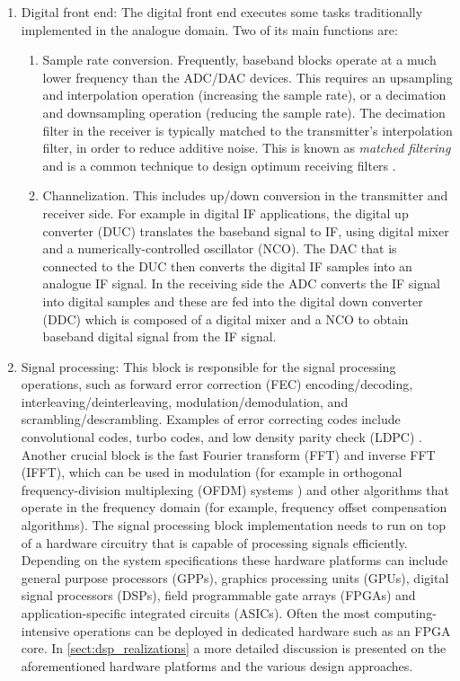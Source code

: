 \begin{enumerate}
  \item Digital front end: The digital front end executes some tasks traditionally implemented in the analogue domain. Two of its main functions are\cite{digital_frontend_sdr}:
  \begin{enumerate}
    \item  Sample rate conversion. Frequently, baseband blocks operate at a much lower frequency than the ADC/DAC devices. This requires an upsampling and interpolation operation (increasing the sample rate), or a decimation and downsampling operation (reducing the sample rate). The decimation filter in the receiver is typically matched to the transmitter's interpolation filter, in order to reduce additive noise. This is known as \emph{matched filtering} and is a common technique to design optimum receiving filters \cite{communication_systems_carlson}.
    \item Channelization. This includes up/down conversion in the transmitter and receiver side. For example in digital IF applications, the digital up converter (DUC) translates the baseband signal to IF, using digital mixer and a numerically-controlled oscillator (NCO). The DAC that is connected to the DUC then converts the digital IF samples into an analogue IF signal. In the receiving side the ADC converts the IF signal into digital samples and these are fed into the digital down converter (DDC) which is composed of a digital mixer and a NCO to obtain baseband digital signal from the IF signal.
  \end{enumerate}

  \item Signal processing: This block is responsible for the signal processing operations, such as forward error correction (FEC) encoding/decoding, interleaving/deinterleaving, modulation/demodulation, and scrambling/descrambling. Examples of error correcting codes include convolutional codes, turbo codes, and low density parity check (LDPC) \cite{crc_for_short_control_frames}. Another crucial block is the fast Fourier transform (FFT) and inverse FFT (IFFT), which can be used in modulation (for example in orthogonal frequency-division multiplexing (OFDM) systems \cite{ofdm_baseband_receiver}) and other algorithms that operate in the frequency domain (for example, frequency offset compensation algorithms). The signal processing block implementation needs to run on top of a hardware circuitry that is capable of processing signals efficiently. Depending on the system specifications these hardware platforms can include general purpose processors (GPPs), graphics processing units (GPUs), digital signal processors (DSPs), field programmable gate arrays (FPGAs) and application-specific integrated circuits (ASICs). Often the most computing-intensive operations can be deployed in dedicated hardware such as an FPGA core. In \autoref{sect:dsp_realizations} a more detailed discussion is presented on the aforementioned hardware platforms and the various design approaches.
\end{enumerate}

